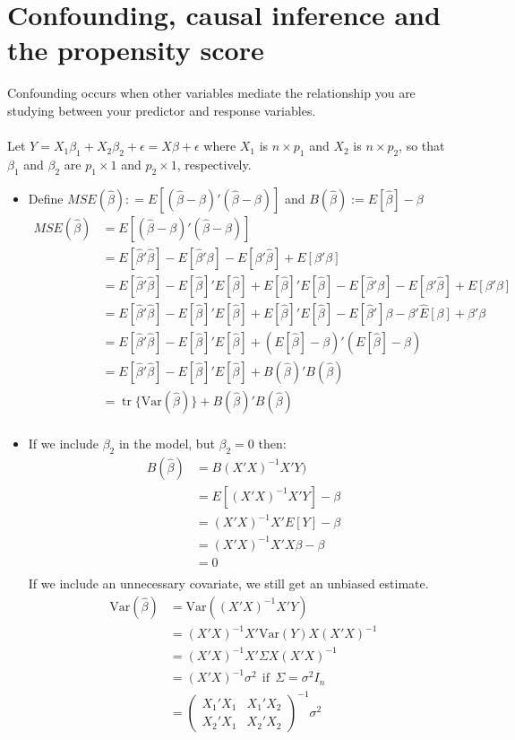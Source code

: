 \documentclass[12pt]{article}\usepackage{graphicx, color}
\theoremstyle{definition}
\newcommand{\Var}{\mathrm{Var}}
\renewcommand{\hat}{\widehat}
\DeclareMathOperator{\tr}{tr}
\begin{document}
\section{Confounding, causal inference and the propensity score}
Confounding occurs when other variables mediate the relationship you are studying between your predictor and response variables.
\ \\ \ \\
 Let $Y=X_1 \beta_1 +X_2 \beta_2 +\epsilon=X \beta +\epsilon$ where $X_1$ is $n\times p_1$ and $X_2$ is $n \times p_2$, so that $\beta_1$ and $\beta_2$ are $p_1 \times 1$ and $p_2 \times 1$, respectively.
\begin{itemize}
\item Define $MSE(\hat \beta): = E[(\hat \beta-\beta)'(\hat \beta-\beta)]$ and $B(\hat \beta):=E[\hat \beta]-\beta$
\begin{align*}MSE(\hat \beta)& = E[(\hat \beta-\beta)'(\hat \beta-\beta)]\\
& = E[\hat{\beta}'\hat{\beta}]-E[\hat \beta'\beta]-E[\beta'\hat \beta]+E[\beta'\beta]\\
& = E[\hat{\beta}'\hat{\beta}]-E[\hat \beta]'E[\hat \beta]+E[\hat \beta]'E[\hat \beta]-E[\hat \beta'\beta]-E[\beta'\hat \beta]+E[\beta'\beta]\\
& = E[\hat{\beta}'\hat{\beta}]-E[\hat \beta]'E[\hat \beta]+E[\hat \beta]'E[\hat \beta]-E[\hat \beta']\beta-\beta'\hat E[ \beta]+\beta'\beta\\
& = E[\hat{\beta}'\hat{\beta}]-E[\hat \beta]'E[\hat \beta]+(E[\hat \beta]-\beta)'(E[\hat \beta]-\beta)\\
& = E[\hat{\beta}'\hat{\beta}]-E[\hat \beta]'E[\hat \beta]+B(\hat \beta)'B(\hat \beta)\\
& = \tr\{\Var(\hat \beta)\}+B(\hat \beta)'B(\hat \beta)\\
\end{align*}
\item If we include $\beta_2$ in the model, but $\beta_2=0$ then:
\begin{align*}B(\hat \beta)&=B(X'X)^{-1}X'Y)\\
&=E[(X'X)^{-1}X'Y]-\beta\\
&=(X'X)^{-1}X'E[Y]-\beta\\
&=(X'X)^{-1}X'X\beta-\beta\\
&=0\\
\end{align*}
If we include an unnecessary covariate, we still get an unbiased estimate. 
\begin{align*}\Var(\hat \beta)&=\Var((X'X)^{-1}X'Y)\\
&=(X'X)^{-1}X'\Var(Y)X(X'X)^{-1}\\
&=(X'X)^{-1}X'\Sigma X(X'X)^{-1}\\
&=(X'X)^{-1}\sigma^2~~\text{if}~~\Sigma=\sigma^2I_n\\
&=\begin{pmatrix}X_1'X_1 & X_1'X_2 \\ X_2'X_1 & X_2'X_2\end{pmatrix}^{-1}\sigma^2\\
\end{align*}


\end{itemize}
\end{document}
